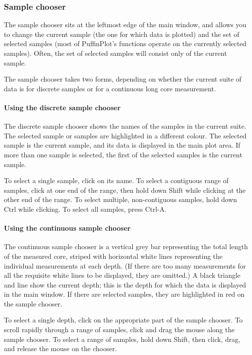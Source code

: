 \documentclass[a4paper,british]{article}
\newcommand{\ppcmd}[1]{\textsf{#1}} %
\begin{document}
\subsubsection{Sample chooser}

The sample chooser sits at the leftmost edge of the main window, and
allows you to change the current sample (the one for which data is
plotted) and the set of selected samples (most of PuffinPlot's functions
operate on the currently selected samples). Often, the set of selected
samples will consist only of the current sample.

The sample chooser takes two forms, depending on whether the current
suite of data is for discrete samples or for a continuous long core
measurement.

\paragraph{Using the discrete sample chooser}

The discrete sample chooser shows the names of the samples in the current
suite. The selected sample or samples are highlighted in a different colour.
The selected sample is the current sample, and its data is displayed in the
main plot area. If more than one sample is selected, the first of the
selected samples is the current sample.

To select a single sample, click on its name. To select a contiguous range of
samples, click at one end of the range, then hold down \ppcmd{Shift} while
clicking at the other end of the range. To select multiple, non-contiguous
samples, hold down \ppcmd{Ctrl} while clicking. To select all samples, press
\ppcmd{Ctrl-A}.

\paragraph{Using the continuous sample chooser}

The continuous sample chooser is a vertical grey bar representing the total
length of the measured core, striped with horizontal white lines representing
the individual measurements at each depth. (If there are too many
measurements for all the requisite white lines to be displayed, they are
omitted.) A black triangle and line show the current depth; this is the depth
for which the data is displayed in the main window. If there are selected
samples, they are highlighted in red on the sample chooser.

To select a single depth, click on the appropriate part of the sample
chooser. To scroll rapidly through a range of samples, click and drag the
mouse along the sample chooser. To select a range of samples, hold down
\ppcmd{Shift}, then click, drag, and release the mouse on the chooser.
\end{document}
